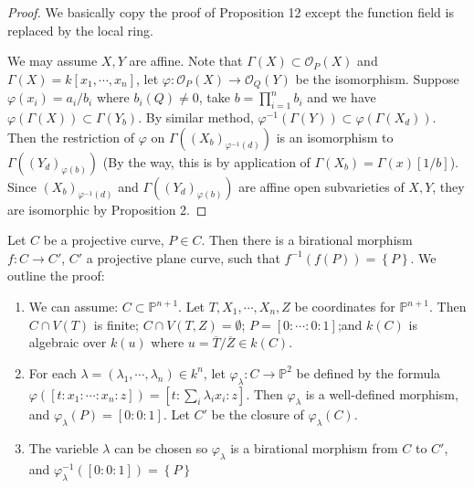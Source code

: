 \documentclass{solution}
\begin{document}
\begin{proof}
    We basically copy the proof of Proposition 12 except the function field is replaced by the local ring.

    We may assume $X, Y$ are affine. Note that $\Gamma(X) \subset \mathcal{O}_{P}(X)$ and $\Gamma(X) = k[x_1, \cdots, x_n]$, let $\varphi: \mathcal{O}_{P}(X) \rightarrow \mathcal{O}_{Q}(Y)$ be the isomorphism. Suppose $\varphi(x_i) = a_i / b_i$ where $b_i(Q) \ne 0$, take $b = \prod\limits_{i = 1}^{n} b_i$ and we have $\varphi(\Gamma(X)) \subset \Gamma(Y_b)$. By similar method, $\varphi ^{-1}(\Gamma(Y)) \subset \varphi(\Gamma(X_d))$. Then the restriction of $\varphi$ on $\Gamma((X_b)_{\varphi ^{-1} (d)})$ is an isomorphism to $\Gamma((Y_d)_{\varphi(b)})$ (By the way, this is by application of $\Gamma(X_b) = \Gamma(x)[1 / b]$). Since $(X_b)_{\varphi ^{-1} (d)}$ and $\Gamma((Y_d)_{\varphi(b)})$ are affine open subvarieties of $X, Y$, they are isomorphic by Proposition 2.
\end{proof}

\begin{problem}{6.43}
    Let $C$ be a projective curve, $P \in C$. Then there is a birational morphism $f: C \rightarrow C'$, $C'$ a projective plane curve, such that $f ^{-1}(f(P)) = \left\lbrace P \right\rbrace$. We outline the proof:
    \begin{enumerate}
        \item We can assume: $C \subset \mathbb{P}^{n + 1}$. Let $T, X_1, \cdots, X_n, Z$ be coordinates for $\mathbb{P}^{n + 1}$. Then $C \cap V(T)$ is finite; $C \cap V(T, Z) = \emptyset$; $P = [0:\cdots:0:1]$;and $k(C)$ is algebraic over $k(u)$ where $u = \overline{T} / \overline{Z} \in k(C)$.
        \item For each $\lambda = (\lambda_1, \cdots, \lambda_n) \in k^n$, let $\varphi_\lambda: C \rightarrow \mathbb{P}^2$ be defined by the formula $\varphi([t: x_1 : \cdots : x_n : z]) = [t: \sum\limits_{i} \lambda_ix_i : z]$. Then $\varphi_\lambda$ is a well-defined morphism, and $\varphi_\lambda(P) = [0:0:1]$. Let $C'$ be the closure of $\varphi_\lambda(C)$.
        \item The varieble $\lambda$ can be chosen so $\varphi_\lambda$ is a birational morphism from $C$ to $C'$, and $\varphi_\lambda ^{-1}([0:0:1]) = \left\lbrace P \right\rbrace$
    \end{enumerate}
\end{problem}
\end{document}
